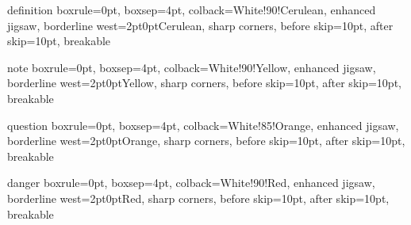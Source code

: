 
\usepackage[dvipsnames]{xcolor} %
\usepackage[many]{tcolorbox} %

\usepackage{amsthm}
\theoremstyle{definition}

\usepackage{listings} %


\newenvironment{definition}{
    \textbf{Definition}
}
    
\tcolorboxenvironment{definition}{
    boxrule=0pt,
    boxsep=4pt, %
    colback={White!90!Cerulean}, %
    enhanced jigsaw, %
    borderline west={2pt}{0pt}{Cerulean},
    sharp corners,
    before skip=10pt,
    after skip=10pt,
    breakable
}

\newenvironment{note}{
    \textbf{Note}
}

\tcolorboxenvironment{note}{
    boxrule=0pt,
    boxsep=4pt, %
    colback={White!90!Yellow}, %
    enhanced jigsaw, %
    borderline west={2pt}{0pt}{Yellow},
    sharp corners,
    before skip=10pt,
    after skip=10pt,
    breakable
}

\newenvironment{question}{
    \textbf{Question}
}

\tcolorboxenvironment{question}{
    boxrule=0pt,
    boxsep=4pt,
    colback={White!85!Orange},
    enhanced jigsaw,
    borderline west={2pt}{0pt}{Orange},
    sharp corners,
    before skip=10pt,
    after skip=10pt,
    breakable
}

\newenvironment{danger}{
    \textbf{Danger}
}

\tcolorboxenvironment{danger}{
    boxrule=0pt,
    boxsep=4pt,
    colback={White!90!Red},
    enhanced jigsaw,
    borderline west={2pt}{0pt}{Red},
    sharp corners,
    before skip=10pt,
    after skip=10pt,
    breakable
}

